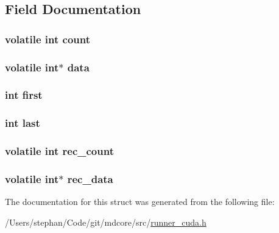\subsection{Field Documentation}
\hypertarget{structqueue__cuda_ab2caed1cbe66b4adb794da880e147fdc}{
\subsubsection[{count}]{\setlength{\rightskip}{0pt plus 5cm}volatile int count}}\label{structqueue__cuda_ab2caed1cbe66b4adb794da880e147fdc}
\hypertarget{structqueue__cuda_aa9110aa2633e6059a5929565aefaf3ec}{
\subsubsection[{data}]{\setlength{\rightskip}{0pt plus 5cm}volatile int$\ast$ data}}\label{structqueue__cuda_aa9110aa2633e6059a5929565aefaf3ec}
\hypertarget{structqueue__cuda_a6c8ec3c3e77241328358d43697f6f840}{
\subsubsection[{first}]{\setlength{\rightskip}{0pt plus 5cm}int first}}\label{structqueue__cuda_a6c8ec3c3e77241328358d43697f6f840}
\hypertarget{structqueue__cuda_a72e27dee31b1c4c6a504fbed29542d97}{
\subsubsection[{last}]{\setlength{\rightskip}{0pt plus 5cm}int last}}\label{structqueue__cuda_a72e27dee31b1c4c6a504fbed29542d97}
\hypertarget{structqueue__cuda_aa2f0192d7cc598812ece12dc8acb1a4a}{
\subsubsection[{rec\-\_\-count}]{\setlength{\rightskip}{0pt plus 5cm}volatile int rec\-\_\-count}}\label{structqueue__cuda_aa2f0192d7cc598812ece12dc8acb1a4a}
\hypertarget{structqueue__cuda_a0d911ca38ccdae3becea0f18836a3c90}{
\subsubsection[{rec\-\_\-data}]{\setlength{\rightskip}{0pt plus 5cm}volatile int$\ast$ rec\-\_\-data}}\label{structqueue__cuda_a0d911ca38ccdae3becea0f18836a3c90}


The documentation for this struct was generated from the following file\-:\begin{DoxyCompactItemize}
\item 
/\-Users/stephan/\-Code/git/mdcore/src/\hyperlink{runner__cuda_8h}{runner\-\_\-cuda.\-h}\end{DoxyCompactItemize}
